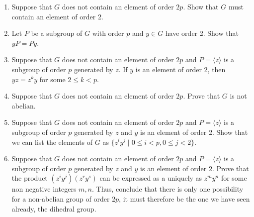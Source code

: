 {\begin{enumerate}
\begin{enumerate}
\item
Suppose that $G$ does not contain an element of order $2p$.  Show that $G$ must contain an element of order 2. 



\item
Let $P$ be a subgroup of $G$ with order $p$ and $y \in G$ have order 2.  Show that $yP = Py$.



\item
Suppose that $G$ does not contain an element of order $2p$ and $P = \langle z \rangle$ is a subgroup of order $p$ generated by $z$.  If $y$ is an element of order 2, then $yz = z^ky$ for some $2 \leq k < p$.



\item
Suppose that $G$ does not contain an element of order $2p$.  Prove that $G$ is not abelian.



\item
Suppose that $G$ does not contain an element of order $2p$ and $P = \langle z \rangle$ is a subgroup of order $p$ generated by $z$ and $y$ is an element of order 2.
Show that we can list the elements of $G$ as $\{z^iy^j\mid 0\leq i<p, 0\leq j < 2\}$.



\item
Suppose that $G$ does not contain an element of order $2p$ and $P = \langle z \rangle$ is a subgroup of order $p$ generated by $z$ and $y$ is an element of order 2.  Prove that the product
$(z^iy^j)(z^ry^s)$ can be expressed as a uniquely as $z^m y^n$ for some non negative integers $m, n$.  Thus, conclude that there is only one possibility for a non-abelian group of order $2p$, it must therefore be the one we have seen already, the dihedral group.



 
\end{enumerate}

 
\end{enumerate}
}

\sagesection




